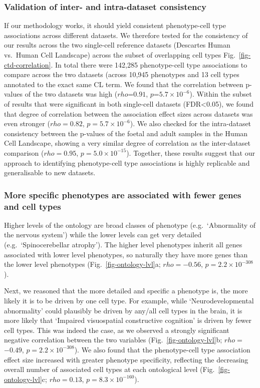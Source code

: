 \documentclass[
]{article}
\begin{document}
\subsubsection{Validation of inter- and intra-dataset
consistency}\label{validation-of-inter--and-intra-dataset-consistency}

If our methodology works, it should yield consistent phenotype-cell type
associations across different datasets. We therefore tested for the
consistency of our results across the two single-cell reference datasets
(Descartes Human vs.~Human Cell Landscape) across the subset of
overlapping cell types Fig.~\ref{fig-ctd-correlation}. In total there
were 142,285 phenotype-cell type associations to compare across the two
datasets (across 10,945 phenotypes and 13 cell types annotated to the
exact same CL term. We found that the correlation between p-values of
the two datasets was high (\(rho\)=\(0.91\),
\(p\)=\(5.7 \times 10^{-6}\)). Within the subset of results that were
significant in both single-cell datasets (FDR\textless0.05), we found
that degree of correlation between the association effect sizes across
datasets was even stronger (\(rho=\)\(0.82\),
\(p=\)\(5.7 \times 10^{-6}\)). We also checked for the intra-dataset
consistency between the p-values of the foetal and adult samples in the
Human Cell Landscape, showing a very similar degree of correlation as
the inter-dataset comparison (\(rho=\)\(0.95\),
\(p=\)\(5.0 \times 10^{-15}\)). Together, these results suggest that our
approach to identifying phenotype-cell type associations is highly
replicable and generalisable to new datasets.

\subsubsection{More specific phenotypes are associated with fewer genes
and cell
types}\label{more-specific-phenotypes-are-associated-with-fewer-genes-and-cell-types}

Higher levels of the ontology are broad classes of phenotype
(e.g.~`Abnormality of the nervous system') while the lower levels can
get very detailed (e.g.~`Spinocerebellar atrophy'). The higher level
phenotypes inherit all genes associated with lower level phenotypes, so
naturally they have more genes than the lower level phenotypes
(Fig.~\ref{fig-ontology-lvl}a; \(rho=\)\(-0.56\),
\(p=\)\(2.2 \times 10^{-308}\)).

Next, we reasoned that the more detailed and specific a phenotype is,
the more likely it is to be driven by one cell type. For example, while
`Neurodevelopmental abnormality' could plausibly be driven by any/all
cell types in the brain, it is more likely that `Impaired visuospatial
constructive cognition' is driven by fewer cell types. This was indeed
the case, as we observed a strongly significant negative correlation
between the two variables (Fig.~\ref{fig-ontology-lvl}b;
\(rho=\)\(-0.49\), \(p=\)\(2.2 \times 10^{-308}\)). We also found that
the phenotype-cell type association effect size increased with greater
phenotype specificity, reflecting the decreasing overall number of
associated cell types at each ontological level
(Fig.~\ref{fig-ontology-lvl}c; \(rho=\)\(0.13\),
\(p=\)\(8.3 \times 10^{-160}\)).
\end{document}
